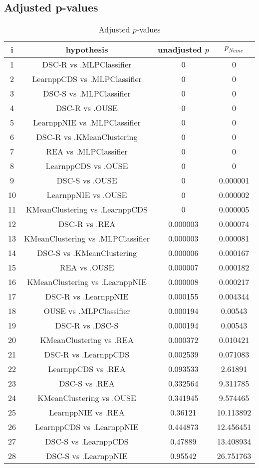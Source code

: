 \documentclass[a4paper,10pt]{article}
\begin{document}
\begin{landscape}
\pagebreak

\subsection{Adjusted p-values}

\begin{table}[!htp]
\centering\scriptsize
\begin{tabular}{cccc}
i&hypothesis&unadjusted $p$&$p_{Neme}$\\
\hline1&DSC-R vs .MLPClassifier&0&0\\
2&LearnppCDS vs .MLPClassifier&0&0\\
3&DSC-S vs .MLPClassifier&0&0\\
4&DSC-R vs .OUSE&0&0\\
5&LearnppNIE vs .MLPClassifier&0&0\\
6&DSC-R vs .KMeanClustering&0&0\\
7&REA vs .MLPClassifier&0&0\\
8&LearnppCDS vs .OUSE&0&0\\
9&DSC-S vs .OUSE&0&0.000001\\
10&LearnppNIE vs .OUSE&0&0.000002\\
11&KMeanClustering vs .LearnppCDS&0&0.000005\\
12&DSC-R vs .REA&0.000003&0.000074\\
13&KMeanClustering vs .MLPClassifier&0.000003&0.000081\\
14&DSC-S vs .KMeanClustering&0.000006&0.000167\\
15&REA vs .OUSE&0.000007&0.000182\\
16&KMeanClustering vs .LearnppNIE&0.000008&0.000217\\
17&DSC-R vs .LearnppNIE&0.000155&0.004344\\
18&OUSE vs .MLPClassifier&0.000194&0.00543\\
19&DSC-R vs .DSC-S&0.000194&0.00543\\
20&KMeanClustering vs .REA&0.000372&0.010421\\
21&DSC-R vs .LearnppCDS&0.002539&0.071083\\
22&LearnppCDS vs .REA&0.093533&2.61891\\
23&DSC-S vs .REA&0.332564&9.311785\\
24&KMeanClustering vs .OUSE&0.341945&9.574465\\
25&LearnppNIE vs .REA&0.36121&10.113892\\
26&LearnppCDS vs .LearnppNIE&0.444873&12.456451\\
27&DSC-S vs .LearnppCDS&0.47889&13.408934\\
28&DSC-S vs .LearnppNIE&0.95542&26.751763\\
\hline
\end{tabular}
\caption{Adjusted $p$-values}
\end{table}

\end{landscape}
\end{document}
